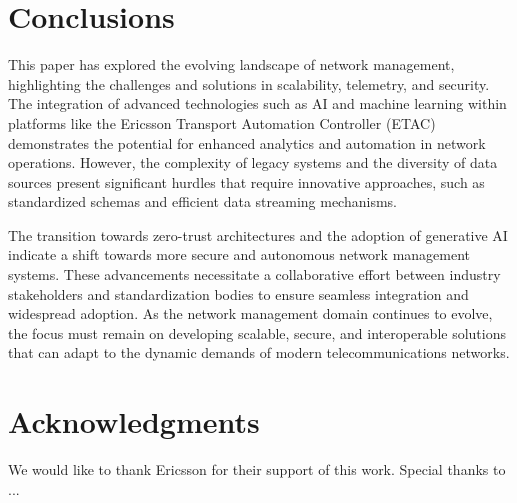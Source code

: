 \documentclass[11pt,sigconf]{iabart}
\begin{document}
\section{Conclusions} \label{conclusions}

This paper has explored the evolving landscape of network management, highlighting the challenges and solutions in scalability, telemetry, and security. The integration of advanced technologies such as AI and machine learning within platforms like the Ericsson Transport Automation Controller (ETAC) demonstrates the potential for enhanced analytics and automation in network operations. However, the complexity of legacy systems and the diversity of data sources present significant hurdles that require innovative approaches, such as standardized schemas and efficient data streaming mechanisms.

The transition towards zero-trust architectures and the adoption of generative AI indicate a shift towards more secure and autonomous network management systems. These advancements necessitate a collaborative effort between industry stakeholders and standardization bodies to ensure seamless integration and widespread adoption. As the network management domain continues to evolve, the focus must remain on developing scalable, secure, and interoperable solutions that can adapt to the dynamic demands of modern telecommunications networks.

\section{Acknowledgments}

We would like to thank Ericsson for their support of this work. Special thanks to ...



\end{document}
